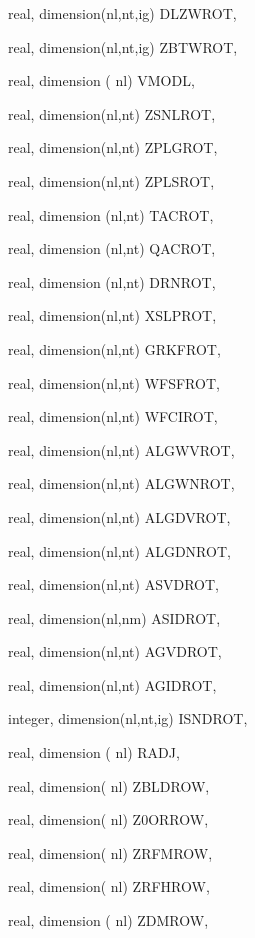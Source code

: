 {\begin{DoxyParamCaption}
\item[{real, dimension(nl,nt,ig)}]{D\+L\+Z\+W\+R\+O\+T, }
\item[{real, dimension(nl,nt,ig)}]{Z\+B\+T\+W\+R\+O\+T, }
\item[{real, dimension  ( nl)}]{V\+M\+O\+D\+L, }
\item[{real, dimension(nl,nt)}]{Z\+S\+N\+L\+R\+O\+T, }
\item[{real, dimension(nl,nt)}]{Z\+P\+L\+G\+R\+O\+T, }
\item[{real, dimension(nl,nt)}]{Z\+P\+L\+S\+R\+O\+T, }
\item[{real, dimension (nl,nt)}]{T\+A\+C\+R\+O\+T, }
\item[{real, dimension (nl,nt)}]{Q\+A\+C\+R\+O\+T, }
\item[{real, dimension (nl,nt)}]{D\+R\+N\+R\+O\+T, }
\item[{real, dimension(nl,nt)}]{X\+S\+L\+P\+R\+O\+T, }
\item[{real, dimension(nl,nt)}]{G\+R\+K\+F\+R\+O\+T, }
\item[{real, dimension(nl,nt)}]{W\+F\+S\+F\+R\+O\+T, }
\item[{real, dimension(nl,nt)}]{W\+F\+C\+I\+R\+O\+T, }
\item[{real, dimension(nl,nt)}]{A\+L\+G\+W\+V\+R\+O\+T, }
\item[{real, dimension(nl,nt)}]{A\+L\+G\+W\+N\+R\+O\+T, }
\item[{real, dimension(nl,nt)}]{A\+L\+G\+D\+V\+R\+O\+T, }
\item[{real, dimension(nl,nt)}]{A\+L\+G\+D\+N\+R\+O\+T, }
\item[{real, dimension(nl,nt)}]{A\+S\+V\+D\+R\+O\+T, }
\item[{real, dimension(nl,nm)}]{A\+S\+I\+D\+R\+O\+T, }
\item[{real, dimension(nl,nt)}]{A\+G\+V\+D\+R\+O\+T, }
\item[{real, dimension(nl,nt)}]{A\+G\+I\+D\+R\+O\+T, }
\item[{integer, dimension(nl,nt,ig)}]{I\+S\+N\+D\+R\+O\+T, }
\item[{real, dimension   ( nl)}]{R\+A\+D\+J, }
\item[{real, dimension( nl)}]{Z\+B\+L\+D\+R\+O\+W, }
\item[{real, dimension( nl)}]{Z0\+O\+R\+R\+O\+W, }
\item[{real, dimension( nl)}]{Z\+R\+F\+M\+R\+O\+W, }
\item[{real, dimension( nl)}]{Z\+R\+F\+H\+R\+O\+W, }
\item[{real, dimension ( nl)}]{Z\+D\+M\+R\+O\+W, }

\end{DoxyParamCaption}}
